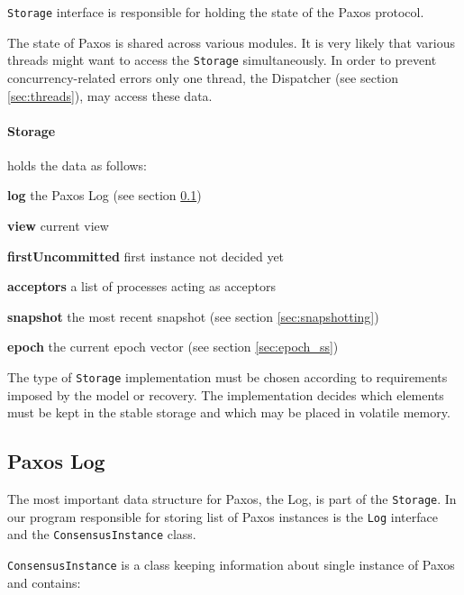 \texttt{Storage} interface is responsible for holding the state of the Paxos protocol.

The state of Paxos is shared across various modules.
It is very likely that various threads might want to access the \texttt{Storage} simultaneously. In order to prevent concurrency-related errors only one thread, the Dispatcher (see section \ref{sec:threads}), may access these data. 

\paragraph{\normalfont \ttfamily Storage}
holds the data as follows:
\begin{tightList}[\setlength{\labelwidth}{0em}]
  \item[\textbf{log}] the Paxos Log (see section \ref{subsec:the_paxos_log})
  \item[\textbf{view}] current view
  \item[\textbf{firstUncommitted}] first instance not decided yet
  \item[\textbf{acceptors}] a list of processes acting as acceptors
  \item[\textbf{snapshot}] the most recent snapshot (see section \ref{sec:snapshotting})
  \item[\textbf{epoch}] the current epoch vector (see section \ref{sec:epoch_ss})
\end{tightList}

\vspace{\parsep}

The type of \texttt{Storage} implementation must be chosen according to requirements imposed by the model or recovery.
The implementation decides which elements must be kept in the stable storage and which may be placed in volatile memory.

\subsection{Paxos Log}
\label{subsec:the_paxos_log}

The most important data structure for Paxos, the Log, is part of the \texttt{Storage}.
In our program responsible for storing list of Paxos instances is the \texttt{Log} interface and the \texttt{Con\-sen\-susInstance} class.

\texttt{ConsensusInstance} is a class keeping information about single instance of Paxos and contains:

